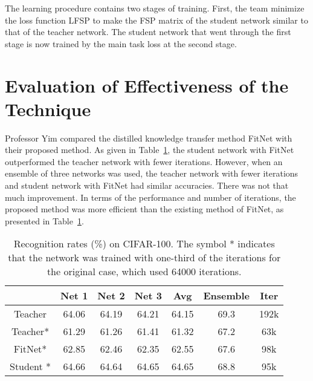\documentclass[twocolumn]{article}
\begin{document}
   The learning procedure contains two stages of training. First, the team minimize the loss function LFSP to make the FSP matrix of the student network similar to that of the teacher network. The student network that went through the first stage is now trained by the main task loss at the second stage.
   
   \section{Evaluation of Effectiveness of the Technique}
   Professor Yim compared the distilled knowledge transfer method FitNet with their proposed method. As given in Table~\ref{rate}, the student network with FitNet outperformed the teacher network with fewer iterations. However, when an ensemble of three networks was used, the teacher network with fewer iterations and student network with FitNet had similar accuracies. There was not that much improvement. In terms of the performance and number of iterations, the proposed method was more efficient than the existing method of FitNet, as presented in Table~\ref{rate}.
   \begin{table}[h]
   	\centering
   	\caption{Recognition rates (\%) on CIFAR-100. The symbol * indicates that the network was trained with one-third of the iterations for the original case, which used 64000 iterations.}\label{rate}
   	\begin{tabular}{|c|c|c|c|c|c|c|}
   		\hline\hline
   		         &Net 1& Net 2 & Net 3& Avg& Ensemble& Iter\\
   		\hline
   		Teacher &64.06& 64.19 &64.21& 64.15&69.3& 192k\\
   
   		Teacher*&61.29& 61.26& 61.41& 61.32& 67.2&63k\\
   		
   	FitNet\cite{Romero2014FitNets}*&62.85&62.46 &62.35&62.55& 67.6&98k\\
   		
   	  Student * &64.66& 64.64 & 64.65&64.65&68.8&95k\\
   		\hline\hline
   	\end{tabular}
   \end{table}
  

	
\end{document}
